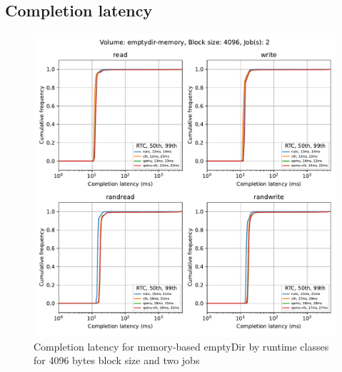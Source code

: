 \subsection{Completion latency}
\begin{figure}[ht]
  \begin{center}
    \includegraphics[width=12cm]{results/subplot_clat_bw_by_rw(emptydir-memory,2,4096).pdf}
    \caption{Completion latency for memory-based emptyDir by runtime classes for 4096 bytes block size and two jobs}
    \label{fig:ResultsEDMEMClatByRTC4096-2}
  \end{center}
\end{figure}

